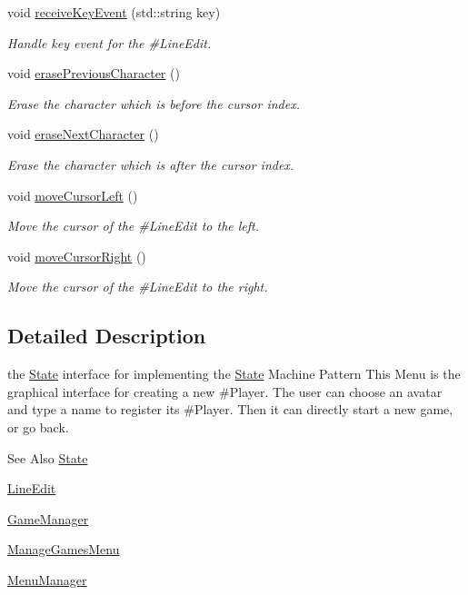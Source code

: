 \begin{DoxyCompactItemize}
void \hyperlink{class_symp_1_1_new_game_menu_adb285b34356f42ec8dd9976b9eed666a}{receive\-Key\-Event} (std\-::string key)
\begin{DoxyCompactList}\small\item\em Handle key event for the \#\-Line\-Edit. \end{DoxyCompactList}\item 
void \hyperlink{class_symp_1_1_new_game_menu_a3d8810a072c5baff55c7580efa8152ea}{erase\-Previous\-Character} ()
\begin{DoxyCompactList}\small\item\em Erase the character which is before the cursor index. \end{DoxyCompactList}\item 
void \hyperlink{class_symp_1_1_new_game_menu_a9a5d8098dfff416824468045feb51d08}{erase\-Next\-Character} ()
\begin{DoxyCompactList}\small\item\em Erase the character which is after the cursor index. \end{DoxyCompactList}\item 
void \hyperlink{class_symp_1_1_new_game_menu_ade3a666ae49f6e671ac8ddfcba42b8ad}{move\-Cursor\-Left} ()
\begin{DoxyCompactList}\small\item\em Move the cursor of the \#\-Line\-Edit to the left. \end{DoxyCompactList}\item 
void \hyperlink{class_symp_1_1_new_game_menu_a76324c780657441e0ebd8a9ec8653532}{move\-Cursor\-Right} ()
\begin{DoxyCompactList}\small\item\em Move the cursor of the \#\-Line\-Edit to the right. \end{DoxyCompactList}\end{DoxyCompactItemize}


\subsection{Detailed Description}
the \hyperlink{class_symp_1_1_state_ad44d90b6e1b68eb021ceaa0cb98141a4}{State} interface for implementing the \hyperlink{class_symp_1_1_state}{State} Machine Pattern This Menu is the graphical interface for creating a new \#\-Player. The user can choose an avatar and type a name to register its \#\-Player. Then it can directly start a new game, or go back. \begin{DoxySeeAlso}{See Also}
\hyperlink{class_symp_1_1_state}{State} 

\hyperlink{class_symp_1_1_line_edit}{Line\-Edit} 

\hyperlink{class_symp_1_1_game_manager}{Game\-Manager} 

\hyperlink{class_symp_1_1_manage_games_menu}{Manage\-Games\-Menu} 

\hyperlink{class_symp_1_1_menu_manager}{Menu\-Manager} 
\end{DoxySeeAlso}


